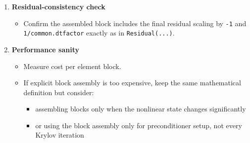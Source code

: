 \documentclass[11pt]{article}
\begin{document}
\begin{enumerate}[leftmargin=*]
\item \textbf{Residual-consistency check}
\begin{itemize}[leftmargin=*]
\item Confirm the assembled block includes the final residual scaling by
\texttt{-1} and \texttt{1/common.dtfactor} exactly as in \texttt{Residual(...)}.
\end{itemize}

\item \textbf{Performance sanity}
\begin{itemize}[leftmargin=*]
\item Measure cost per element block.
\item If explicit block assembly is too expensive, keep the same mathematical
definition but consider:
\begin{itemize}[leftmargin=*]
\item assembling blocks only when the nonlinear state changes significantly
\item or using the block assembly only for preconditioner setup, not every
Krylov iteration
\end{itemize}
\end{itemize}
\end{enumerate}
\end{document}
